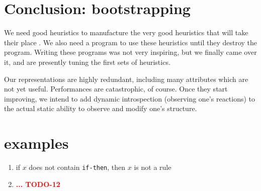 \documentclass[11pt,a4paper,svgnames]{article}
\begin{document}
  \section{Conclusion: bootstrapping}
  \label{sec:concl-bootstrap}

  We need good heuristics to manufacture the very good heuristics that will take
  their place \cite{Pitrat-Maciste-1985}. We also need a program to use these
  heuristics until they destroy the program. Writing these programs was not very
  inspiring, but we finally came over it, and are presently tuning the first sets
  of heuristics.

  Our representations are highly redundant, including many attributes which are
  not yet useful. Performances are catastrophic, of course. Once they start
  improving, we intend to add dynamic introspection (observing one's reactions)
  to the actual static ability to observe and modify one's structure.

  \section*{examples}
  \label{sec:examples}

  \begin{enumerate}
  \item if $x$ does not contain \texttt{if-then}, then $x$ is not a rule
    \item
      {\textcolor{red}{\textbf{... TODO-12}}}

  \end{enumerate}

\clearpage
{}



\end{document}
